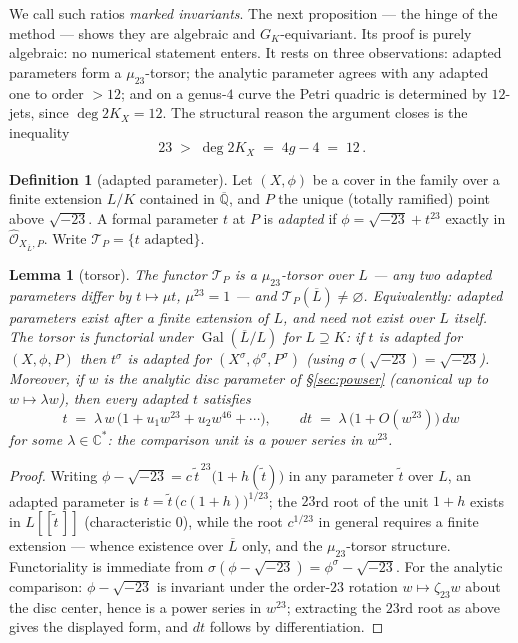 \documentclass[11pt]{amsart}
\newcommand{\QQ}{\mathbb{Q}}
\newcommand{\CC}{\mathbb{C}}
\newcommand{\GK}{G_{K}}
\newcommand{\sqm}{\sqrt{-23}}
\theoremstyle{plain}
\newtheorem{lemma}[theorem]{Lemma}
\theoremstyle{definition}
\newtheorem{definition}[theorem]{Definition}
\begin{document}
We call such ratios \emph{marked invariants}. The next proposition
--- the hinge of the method --- shows they are algebraic and
$\GK$-equivariant. Its proof is purely algebraic: no numerical
statement enters. It rests on three observations: adapted parameters
form a $\mu_{23}$-torsor; the analytic parameter agrees with any
adapted one to order $>12$; and on a genus-$4$ curve the Petri
quadric is determined by $12$-jets, since $\deg 2K_X=12$. The
structural reason the argument closes is the inequality
\[
  \boxed{\,23 \;>\; \deg 2K_X \;=\; 4g-4 \;=\; 12\,.}
\]

\begin{definition}[adapted parameter]\label{def:adapted}
Let $(X,\phi)$ be a cover in the family over a finite extension
$L/K$ contained in $\overline{\QQ}$, and $P$ the unique (totally
ramified) point above $\sqm$. A formal parameter $t$ at $P$ is \emph{adapted} if
$\phi = \sqm + t^{23}$ exactly in
$\widehat{\mathcal{O}}_{X_{\overline L},P}$. Write
$\mathscr{T}_P=\{t \text{ adapted}\}$.
\end{definition}

\begin{lemma}[torsor]\label{lem:adapted}
The functor $\mathscr{T}_P$ is a $\mu_{23}$-torsor over $L$ --- any
two adapted parameters differ by $t\mapsto\mu t$, $\mu^{23}=1$ ---
and $\mathscr{T}_P(\overline{L})\neq\varnothing$. Equivalently:
adapted parameters exist after a finite extension of $L$, and need
not exist over $L$ itself. The torsor is functorial under
$\operatorname{Gal}(\overline{L}/L)$ for $L\supseteq K$: if $t$ is
adapted for $(X,\phi,P)$ then $t^{\sigma}$ is adapted for
$(X^{\sigma},\phi^{\sigma},P^{\sigma})$ \textup{(}using
$\sigma(\sqm)=\sqm$\textup{)}. Moreover, if $w$ is the analytic disc
parameter of \S\ref{sec:powser} \textup{(}canonical up to
$w\mapsto\lambda w$\textup{)}, then every adapted $t$ satisfies
\[
  t \;=\; \lambda\, w\,\bigl(1 + u_1w^{23} + u_2w^{46}+\cdots\bigr),
  \qquad
  dt \;=\; \lambda\,\bigl(1+O(w^{23})\bigr)\,dw
\]
for some $\lambda\in\CC^*$: the comparison unit is a power series in
$w^{23}$.
\end{lemma}

\begin{proof}
Writing $\phi-\sqm = c\,\tilde t^{\,23}\bigl(1+h(\tilde t)\bigr)$ in
any parameter $\tilde t$ over $L$, an adapted parameter is
$t=\tilde t\,\bigl(c(1+h)\bigr)^{1/23}$; the $23$rd root of the unit
$1+h$ exists in $L[[\tilde t\,]]$ (characteristic $0$), while the
root $c^{1/23}$ in general requires a finite extension --- whence
existence over $\overline L$ only, and the $\mu_{23}$-torsor
structure. Functoriality is immediate from
$\sigma(\phi-\sqm)=\phi^{\sigma}-\sqm$. For the analytic comparison:
$\phi-\sqm$ is invariant under the order-$23$ rotation
$w\mapsto\zeta_{23}w$ about the disc center, hence is a power series
in $w^{23}$; extracting the $23$rd root as above gives the displayed
form, and $dt$ follows by differentiation.
\end{proof}
\end{document}
